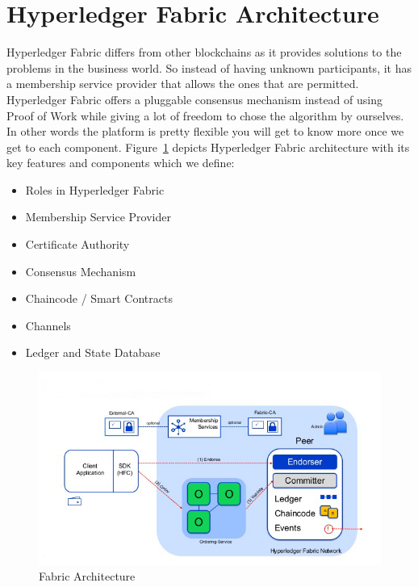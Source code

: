 \section{Hyperledger Fabric Architecture}
Hyperledger Fabric differs from other blockchains as it provides solutions to the problems in the business world. So instead of having unknown participants, it has a membership service provider that allows the ones that are permitted. Hyperledger Fabric offers a pluggable consensus mechanism instead of using Proof of Work while giving a lot of freedom to chose the algorithm by ourselves. In other words the platform is pretty flexible you will get to know more once we get to each component. Figure~\ref{fig:fabric_arch} depicts Hyperledger Fabric architecture with its key features and components which we define:
\begin{itemize}
    \item Roles in Hyperledger Fabric
     \item Membership Service Provider
     \item Certificate Authority
    \item Consensus Mechanism
    \item Chaincode / Smart Contracts 
    \item Channels
    \item Ledger and State Database
\end{itemize}
\begin{figure}[!htb]
    \centering
    \includegraphics[width=1\textwidth]{figures/HyperledgerArchitecture.jpg}
    \caption{Fabric Architecture}
    \label{fig:fabric_arch}
\end{figure}


